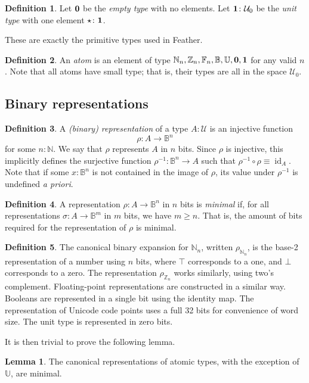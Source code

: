 \documentclass[UKenglish, 11pt, a4paper, parskip=half]{scrbook}
\theoremstyle{definition}
\newtheorem*{definition}{Definition}
\newtheorem*{lemma}{Lemma}
\newcommand{\Empty}{{\vb{0}}}
\newcommand{\Unit}{{\vb{1}}}
\newcommand{\unit}{{\vb{\star}}}
\DeclareMathOperator{\id}{id}
\begin{document}
\begin{definition}
    Let \( \Empty \) be the \textit{empty type} with no elements.
    Let \( \Unit \colon \mathcal U_0 \) be the \textit{unit type} with one element \( \unit \colon \Unit \).
\end{definition}
These are exactly the primitive types used in Feather.
\begin{definition}
    An \textit{atom} is an element of type \( \mathbb N_n, \mathbb Z_n, \mathbb F_n, \mathbb B, \mathbb U, \Empty, \Unit \) for any valid \( n \).
    Note that all atoms have small type; that is, their types are all in the space \( \mathcal U_0 \).
\end{definition}

\subsection{Binary representations}
\begin{definition}
    A \textit{(binary) representation} of a type \( A \colon \mathcal U \) is an injective function
    \[ \rho \colon A \to \mathbb B^n \]
    for some \( n \colon \mathbb N \).
    We say that \( \rho \) represents \( A \) in \( n \) bits.
    Since \( \rho \) is injective, this implicitly defines the surjective function \( \rho^{-1} \colon \mathbb B^n \to A \) such that \( \rho^{-1} \circ \rho \equiv \id_A \).
    Note that if some \( x \colon \mathbb B^n \) is not contained in the image of \( \rho \), its value under \( \rho^{-1} \) is undefined \textit{a priori}.
\end{definition}
\begin{definition}
    A representation \( \rho \colon A \to \mathbb B^n \) in \( n \) bits is \textit{minimal} if, for all representations \( \sigma \colon A \to \mathbb B^m \) in \( m \) bits, we have \( m \geq n \).
    That is, the amount of bits required for the representation of \( \rho \) is minimal.
\end{definition}
\begin{definition}
    The canonical binary expansion for \( \mathbb N_n \), written \( \rho_{\mathbb N_n} \), is the base-2 representation of a number using \( n \) bits, where \( \top \) corresponds to a one, and \( \bot \) corresponds to a zero.
    The representation \( \rho_{\mathbb Z_n} \) works similarly, using two's complement.
    Floating-point representations are constructed in a similar way.
    Booleans are represented in a single bit using the identity map.
    The representation of Unicode code points uses a full 32 bits for convenience of word size.
    The unit type is represented in zero bits.
\end{definition}
It is then trivial to prove the following lemma.
\begin{lemma}
    The canonical representations of atomic types, with the exception of \( \mathbb U \), are minimal.
\end{lemma}
\end{document}
